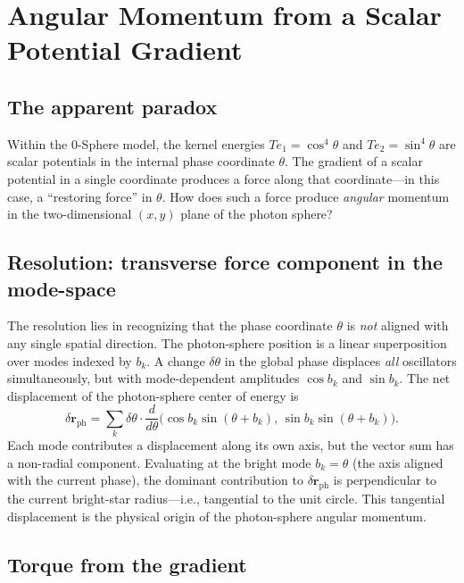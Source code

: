 \documentclass[%
 reprint, amsmath,amssymb, aps, prb, ]{revtex4-2}
\numberwithin{equation}{section}
\newcommand{\iphase}{\theta}
\begin{document}
\section{Angular Momentum from a Scalar Potential Gradient}
\label{sec:gradient}

\subsection{The apparent paradox}

Within the 0-Sphere model, the kernel energies $Te_1 = \cos^4\iphase$ and $Te_2 = \sin^4\iphase$ are scalar potentials in the internal phase coordinate $\iphase$.
The gradient of a scalar potential in a single coordinate produces a force along that coordinate---in this case, a ``restoring force'' in $\iphase$.
How does such a force produce \emph{angular} momentum in the two-dimensional $(x, y)$ plane of the photon sphere?

\subsection{Resolution: transverse force component in the mode-space}

The resolution lies in recognizing that the phase coordinate $\iphase$ is \emph{not} aligned with any single spatial direction.
The photon-sphere position is a linear superposition over modes indexed by $b_k$.
A change $\delta\iphase$ in the global phase displaces \emph{all} oscillators simultaneously, but with mode-dependent amplitudes $\cos b_k$ and $\sin b_k$.
The net displacement of the photon-sphere center of energy is
\begin{equation}
\delta \mathbf{r}_{\text{ph}} = \sum_k \delta\iphase \cdot \frac{d}{d\iphase}\bigl(\cos b_k \sin(\iphase + b_k),\, \sin b_k \sin(\iphase + b_k)\bigr).
\label{eq:displacement}
\end{equation}
Each mode contributes a displacement along its own axis, but the vector sum has a non-radial component.
Evaluating at the bright mode $b_k = \iphase$ (the axis aligned with the current phase), the dominant contribution to $\delta\mathbf{r}_{\text{ph}}$ is perpendicular to the current bright-star radius---i.e., tangential to the unit circle.
This tangential displacement is the physical origin of the photon-sphere angular momentum.

\subsection{Torque from the gradient}
\end{document}
